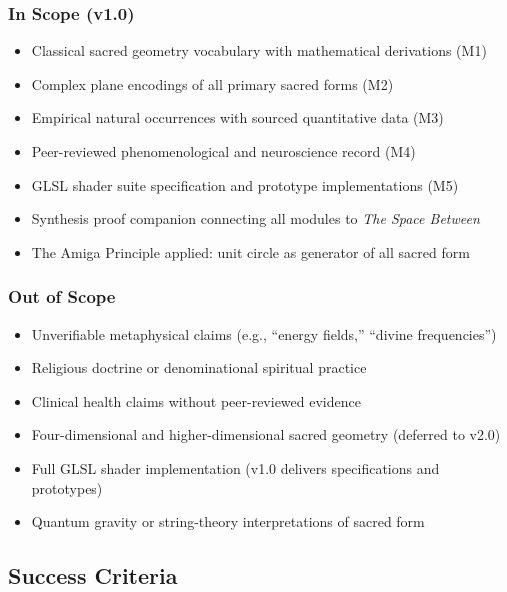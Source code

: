 \documentclass[11pt,letterpaper]{article}
\begin{document}
\subsubsection{In Scope (v1.0)}
\begin{itemize}[leftmargin=1.5em]
  \item Classical sacred geometry vocabulary with mathematical derivations (M1)
  \item Complex plane encodings of all primary sacred forms (M2)
  \item Empirical natural occurrences with sourced quantitative data (M3)
  \item Peer-reviewed phenomenological and neuroscience record (M4)
  \item GLSL shader suite specification and prototype implementations (M5)
  \item Synthesis proof companion connecting all modules to \textit{The Space Between}
  \item The Amiga Principle applied: unit circle as generator of all sacred form
\end{itemize}

\subsubsection{Out of Scope}
\begin{itemize}[leftmargin=1.5em]
  \item Unverifiable metaphysical claims (e.g., ``energy fields,'' ``divine frequencies'')
  \item Religious doctrine or denominational spiritual practice
  \item Clinical health claims without peer-reviewed evidence
  \item Four-dimensional and higher-dimensional sacred geometry (deferred to v2.0)
  \item Full GLSL shader implementation (v1.0 delivers specifications and prototypes)
  \item Quantum gravity or string-theory interpretations of sacred form
\end{itemize}

\subsection{Success Criteria}
\end{document}
